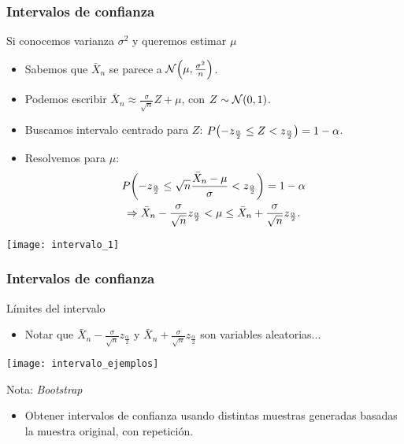 \documentclass[table]{beamer}
\begin{document}
\begin{frame}
    \frametitle{Intervalos de confianza}
    \begin{block}{Si conocemos varianza $\sigma^{2}$ y queremos estimar $\mu$}
        \begin{itemize}
            \item Sabemos que $\bar{X}_{n}$ se parece a $\normal{\mu}{\frac{\sigma^{2}}{n}}$.
            \item Podemos escribir $\bar{X}_{n} \approx \frac{\sigma}{\sqrt{n}} Z + \mu$, con $Z \sim \normal{0}{1}$.
            \item Buscamos intervalo centrado para $Z$:
                $\prob{- z_{\frac{\alpha}{2}} \leq Z < z_{\frac{\alpha}{2}}} = 1 - \alpha$.
            \item Resolvemos para $\mu$:
                \begin{multline*}
                    \prob{- z_{\frac{\alpha}{2}} \leq \sqrt{n} \frac{\bar{X}_{n} - \mu}{\sigma} < z_{\frac{\alpha}{2}}}
                    = 1 - \alpha
                    \\
                    \Rightarrow
                    \bar{X}_{n} - \frac{\sigma}{\sqrt{n}} z_{\frac{\alpha}{2}} < \mu \leq \bar{X}_{n} + \frac{\sigma}{\sqrt{n}} z_{\frac{\alpha}{2}}
                    .
                \end{multline*}
        \end{itemize}
    \end{block}
    \begin{center}
        \texttt{[image: intervalo\_1]}
    \end{center}
\end{frame}

\begin{frame}
    \frametitle{Intervalos de confianza}
    \begin{block}{Límites del intervalo}
        \begin{itemize}
            \item Notar que $\bar{X}_{n} - \frac{\sigma}{\sqrt{n}} z_{\frac{\alpha}{2}}$ y $\bar{X}_{n} + \frac{\sigma}{\sqrt{n}} z_{\frac{\alpha}{2}}$ son variables aleatorias...
        \end{itemize}
    \end{block}
    \begin{center}
        \texttt{[image: intervalo\_ejemplos]}
    \end{center}
    \begin{block}{Nota: \emph{Bootstrap}}
        \begin{itemize}
            \item Obtener intervalos de confianza usando distintas muestras generadas basadas la muestra original, con repetición.
        \end{itemize}
    \end{block}
\end{frame}
\end{document}
